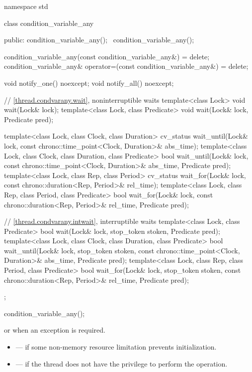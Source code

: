 %
\begin{codeblock}
namespace std {
  class condition_variable_any {
  public:
    condition_variable_any();
    ~condition_variable_any();

    condition_variable_any(const condition_variable_any&) = delete;
    condition_variable_any& operator=(const condition_variable_any&) = delete;

    void notify_one() noexcept;
    void notify_all() noexcept;

    // \ref{thread.condvarany.wait}, noninterruptible waits
    template<class Lock>
      void wait(Lock& lock);
    template<class Lock, class Predicate>
      void wait(Lock& lock, Predicate pred);

    template<class Lock, class Clock, class Duration>
      cv_status wait_until(Lock& lock, const chrono::time_point<Clock, Duration>& abs_time);
    template<class Lock, class Clock, class Duration, class Predicate>
      bool wait_until(Lock& lock, const chrono::time_point<Clock, Duration>& abs_time,
                      Predicate pred);
    template<class Lock, class Rep, class Period>
      cv_status wait_for(Lock& lock, const chrono::duration<Rep, Period>& rel_time);
    template<class Lock, class Rep, class Period, class Predicate>
      bool wait_for(Lock& lock, const chrono::duration<Rep, Period>& rel_time, Predicate pred);

    // \ref{thread.condvarany.intwait}, interruptible waits
    template<class Lock, class Predicate>
      bool wait(Lock& lock, stop_token stoken, Predicate pred);
    template<class Lock, class Clock, class Duration, class Predicate>
      bool wait_until(Lock& lock, stop_token stoken,
                      const chrono::time_point<Clock, Duration>& abs_time, Predicate pred);
    template<class Lock, class Rep, class Period, class Predicate>
      bool wait_for(Lock& lock, stop_token stoken,
                    const chrono::duration<Rep, Period>& rel_time, Predicate pred);
  };
}
\end{codeblock}

%
\begin{itemdecl}
condition_variable_any();
\end{itemdecl}

\begin{itemdescr}
\pnum
\throws
{} or  when an exception is
required.

\pnum
\errors
\begin{itemize}
\item {} --- if some non-memory resource
limitation prevents initialization.

\item {} --- if the thread does not have the
privilege to perform the operation.
\end{itemize}
\end{itemdescr}

